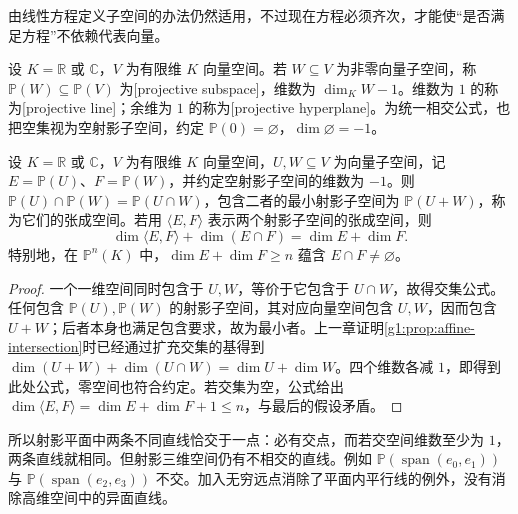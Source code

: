 由线性方程定义子空间的办法仍然适用，不过现在方程必须齐次，才能使“是否满足方程”不依赖代表向量。

\begin{definition}\label{g1:def:projective-subspace}
	设 \(K=\mathbb R\) 或 \(\mathbb C\)，\(V\) 为有限维 \(K\) 向量空间。若 \(W\subseteq V\) 为非零向量子空间，称 \(\mathbb P(W)\subseteq\mathbb P(V)\) 为[projective subspace]，维数为 \(\dim_K W-1\)。维数为 \(1\) 的称为[projective line]；余维为 \(1\) 的称为[projective hyperplane]。为统一相交公式，也把空集视为空射影子空间，约定 \(\mathbb P(0)=\varnothing\)，\(\dim\varnothing=-1\)。
\end{definition}

\begin{proposition}\label{g1:prop:projective-dimension}
	设 \(K=\mathbb R\) 或 \(\mathbb C\)，\(V\) 为有限维 \(K\) 向量空间，\(U,W\subseteq V\) 为向量子空间，记 \(E=\mathbb P(U)\)、\(F=\mathbb P(W)\)，并约定空射影子空间的维数为 \(-1\)。则 \(\mathbb P(U)\cap\mathbb P(W)=\mathbb P(U\cap W)\)，包含二者的最小射影子空间为 \(\mathbb P(U+W)\)，称为它们的张成空间。若用 \(\langle E,F\rangle\) 表示两个射影子空间的张成空间，则
	\[
		\dim\langle E,F\rangle+\dim(E\cap F)=\dim E+\dim F.
	\]
	特别地，在 \(\mathbb P^n(K)\) 中，\(\dim E+\dim F\geq n\) 蕴含 \(E\cap F\ne\varnothing\)。
\end{proposition}
\begin{proof}
	一个一维空间同时包含于 \(U,W\)，等价于它包含于 \(U\cap W\)，故得交集公式。任何包含 \(\mathbb P(U),\mathbb P(W)\) 的射影子空间，其对应向量空间包含 \(U,W\)，因而包含 \(U+W\)；后者本身也满足包含要求，故为最小者。上一章证明\cref{g1:prop:affine-intersection}时已经通过扩充交集的基得到 \(\dim(U+W)+\dim(U\cap W)=\dim U+\dim W\)。四个维数各减 \(1\)，即得到此处公式，零空间也符合约定。若交集为空，公式给出 \(\dim\langle E,F\rangle=\dim E+\dim F+1\leq n\)，与最后的假设矛盾。
\end{proof}

所以射影平面中两条不同直线恰交于一点：必有交点，而若交空间维数至少为 \(1\)，两条直线就相同。但射影三维空间仍有不相交的直线。例如 \(\mathbb P(\operatorname{span}(e_0,e_1))\) 与 \(\mathbb P(\operatorname{span}(e_2,e_3))\) 不交。加入无穷远点消除了平面内平行线的例外，没有消除高维空间中的异面直线。

